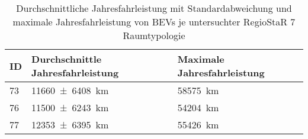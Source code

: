 {
\renewcommand{\arraystretch}{1.2}%
\begin{table}[H]
	\begin{center}
		\caption{Durchschnittliche Jahresfahrleistung mit Standardabweichung und maximale Jahresfahrleistung von BEVs je untersuchter RegioStaR 7 Raumtypologie}
		\begin{tabu} to 0.8\textwidth {X[0.2] X[1.6, r] X[1.5, r]}
			\toprule
			ID 	   				   & Durchschnittle Jahresfahrleistung                  & Maximale Jahresfahrleistung \\ \midrule
			\num{73}               & \SI[separate-uncertainty = true]{11660(6408)}{\km} & \SI{58575}{\km}             \\
			\num{76}               & \SI[separate-uncertainty = true]{11500(6243)}{\km} & \SI{54204}{\km}             \\
			\num{77}               & \SI[separate-uncertainty = true]{12353(6395)}{\km} & \SI{55426}{\km}             \\ \bottomrule
		\end{tabu}
		\label{tab:bev_distance}
	\end{center}
	\vspace{-3mm}%
\end{table}
}